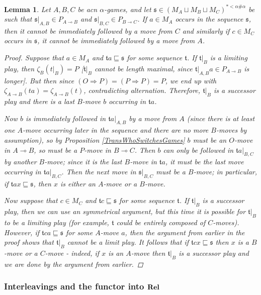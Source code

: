 \documentclass[11pt]{article} %
\theoremstyle{plain} %
\newtheorem{lemma}[theorem]{Lemma}
\theoremstyle{definition} %
\theoremstyle{note}
\theoremstyle{exercisestyle}
\newcommand{\catname}[1]{{\normalfont\textbf{#1}}}
\newcommand{\Rel}{\catname{Rel}}
\renewcommand{\implies}{\multimap}
\newcommand{\cprd}{\sqcup}
\newcommand{\s}{\mathfrak s}
\renewcommand{\t}{\mathfrak t}
\newcommand{\prefix}{\sqsubseteq}
\begin{document}
\begin{lemma}
  \label{AcnLocalSequences}
  Let $A,B,C$ be acn $\alpha$-games, and let $\s\in(M_A\cprd M_B\cprd M_C)^{*<\alpha\#\alpha}$ be such that $\s\vert_{A,B}\in P_{A\implies B}$ and $\s\vert_{B,C}\in P_{B\implies C}$.  If $a\in M_A$ occurs in the sequence $\s$, then it cannot be immediately followed by a move from $C$ and similarly if $c\in M_C$ occurs in $\s$, it cannot be immediately followed by a move from $A$.  
  \begin{proof}
    Suppose that $a\in M_A$ and $\t a\prefix\s$ for some sequence $\t$.  If $\t\vert_B$ is a limiting play, then $\zeta_B(t\vert_B)=P$ [$\t\vert_B$ cannot be length maximal, since $\t\vert_{A,B}a\in P_{A\implies B}$ is longer].  But then since $(O\Rightarrow P)=(P\Rightarrow P)=P$, we end up with $\zeta_{A\implies B}(ta)=\zeta_{A\implies B}(t)$, contradicting alternation.  Therefore, $\t\vert_B$ is a successor play and there is a last $B$-move $b$ occurring in $\t a$.  

    Now $b$ is immediately followed in $\t a\vert_{A,B}$ by a move from $A$ (since there is at least one $A$-move occurring later in the sequence and there are no more $B$-moves by assumption), so by Proposition \ref{TransWhoSwitchesGames} $b$ must be an $O$-move in $A\implies B$, so must be a $P$-move in $B\implies C$.  Then $b$ can only be followed in $\t a\vert_{B,C}$ by another $B$-move; since it is the last $B$-move in $\t a$, it must be the last move occurring in $\t a\vert_{B,C}$.  Then the next move in $\s\vert_{B,C}$ must be a $B$-move; in particular, if $\t ax\prefix \s$, then $x$ is either an $A$-move or a $B$-move.

    Now suppose that $c\in M_C$ and $\t c\prefix\s$ for some sequence $\t$.  If $\t\vert_B$ is a successor play, then we can use an symmetrical argument, but this time it is possible for $\t\vert_B$ to be a limiting play (for example, $\t$ could be entirely composed of $C$-moves).  However, if $\t ca\prefix\s$ for some $A$-move $a$, then the argument from earlier in the proof shows that $\t\vert_B$ cannot be a limit play.  It follows that if $\t cx\prefix\s$ then $x$ is a $B$-move or a $C$-move - indeed, if $x$ is an $A$-move then $\t\vert_B$ is a successor play and we are done by the argument from earlier.
  \end{proof}
\end{lemma}

\subsubsection{Interleavings and the functor into $\Rel$}
\end{document}
